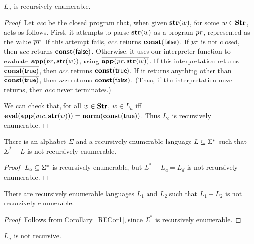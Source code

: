 \begin{theorem}
$L_a$ is recursively enumerable.
\end{theorem}

\begin{proof}
Let $\mathit{acc}$ be the closed program that, when given $\mathbf{str}(w)$, for
some $w\in\mathbf{Str}$, acts as follows.  First, it attempts to parse
$\mathbf{str}(w)$ as a program $\mathit{pr}$, represented as the value
$\overline{\mathit{pr}}$.  If this attempt fails, $\mathit{acc}$ returns
$\mathbf{const}(\mathsf{false})$.  If $\mathit{pr}$ is not closed, then $\mathit{acc}$
returns $\mathbf{const}(\mathsf{false})$.  Otherwise, it uses our interpreter
function to evaluate $\mathbf{app}(\mathit{pr},\mathbf{str}(w))$, using
$\overline{\mathbf{app}(\mathit{pr},\mathbf{str}(w))}$.  If this interpretation
returns $\overline{\mathbf{const}(\mathsf{true})}$, then $\mathit{acc}$ returns
$\mathbf{const}(\mathsf{true})$.  If it returns anything other than
$\overline{\mathbf{const}(\mathsf{true})}$, then $\mathit{acc}$ returns
$\mathbf{const}(\mathsf{false})$.  (Thus, if the interpretation never returns,
then $\mathit{acc}$ never terminates.)

We can check that, for all $w\in\mathbf{Str}$, $w\in L_a$ iff
$\mathbf{eval}(\mathbf{app}(\mathit{acc},\mathbf{str}(w))) =
\mathbf{norm}(\mathbf{const}(\mathsf{true}))$.  Thus $L_a$ is recursively enumerable.
\end{proof}

\begin{corollary}
\label{RECor1}

There is an alphabet $\Sigma$ and a recursively enumerable language
$L\subseteq\Sigma^*$ such that $\Sigma^*-L$ is not recursively enumerable.
\end{corollary}

\begin{proof}
$L_a\subseteq\Sigma^*$ is recursively enumerable, but
$\Sigma^*-L_a=L_d$ is not recursively enumerable.
\end{proof}

\begin{corollary}
\label{RECor2}

There are recursively enumerable languages $L_1$ and $L_2$
such that $L_1-L_2$ is not recursively enumerable.
\end{corollary}

\begin{proof}
Follows from Corollary~\ref{RECor1}, since $\Sigma^*$ is
recursively enumerable.
\end{proof}

\begin{corollary}
\label{RECor3}

$L_a$ is not recursive.
\end{corollary}

